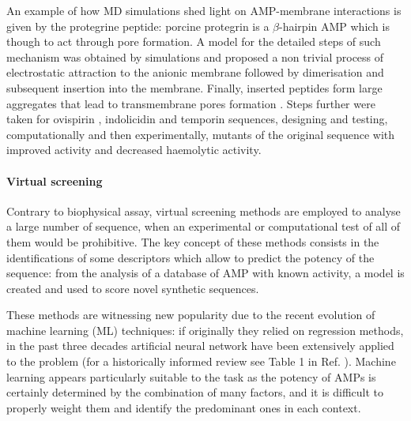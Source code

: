 An example of how MD simulations shed light on AMP-membrane interactions is given by the protegrine peptide: porcine protegrin is a $\beta$-hairpin AMP which is though to act through pore formation. A model for the detailed steps of such mechanism was obtained by simulations and proposed a non trivial process of electrostatic attraction to the anionic membrane followed by dimeri­sation and subsequent insertion into the membrane. Finally, inserted peptides form large aggregates that lead to transmem­brane pores formation \cite{Bolintineanu2011}.
%
Steps further were taken for ovispirin \cite{Khandelia2005}, indolicidin \cite{Tsai2009} and temporin \cite{Farrotti2017} sequences, designing and testing, computationally and then experimentally, mutants of the original sequence with improved activity and decreased haemolytic activity.

\paragraph{Virtual screening}
Contrary to biophysical assay, virtual screening methods are employed to analyse a large number of sequence, when an experimental or computational test of all of them would be prohibitive. The key concept of these methods consists in the identifications of some descriptors which allow to predict the potency of the sequence: from the analysis of a database of AMP with known activity, a model is created and used to score novel synthetic sequences.

These methods are witnessing new popularity due to the recent evolution of machine learning (ML) techniques: if originally they relied on regression methods, in the past three decades artificial neural network have been extensively applied to the problem (for a historically informed review see Table 1 in Ref. \cite{Fjell2011}). Machine learning appears particularly suitable to the task as the potency of AMPs is certainly determined by the combination of many factors, and it is difficult to properly weight them and identify the predominant ones in each context.

